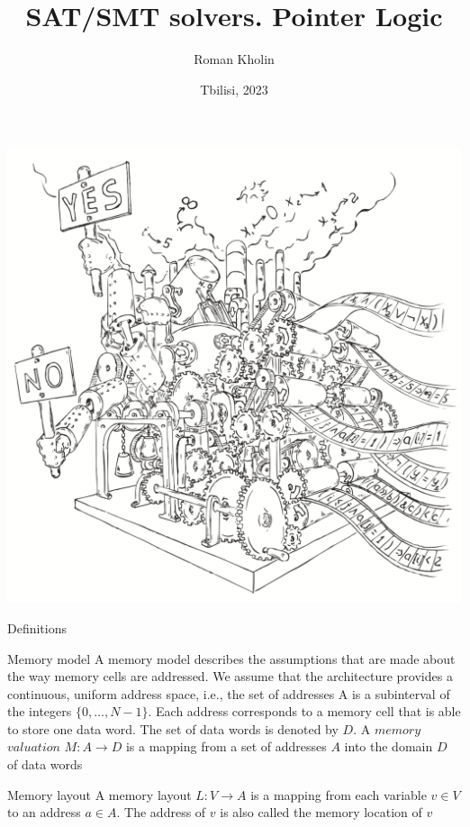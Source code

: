 \documentclass{beamer}
\begin{document}
\title{SAT/SMT solvers. Pointer Logic}
\author{Roman Kholin}
\date{Tbilisi, 2023}

\begin{frame}
\includegraphics[scale=0.5]{../decision-procedure.png}
\end{frame}

\frame{\titlepage}

\begin{frame}{Definitions}
\begin{block}{Memory model}
A memory model describes the assumptions that are made about the way memory cells are addressed. We assume that the architecture provides a continuous, uniform address space, i.e., the set of addresses A is a subinterval of the integers $\{0, \dots, N - 1\}$. Each address corresponds to a memory cell that is able to store one data word. The set of data words is denoted by $D$. A $memory$ $valuation$ $M : A \rightarrow D$ is a mapping from a set of addresses $A$ into the domain $D$ of data words
\end{block}
\begin{block}{Memory layout}
A memory layout $L : V \rightarrow A$ is a mapping from each variable $v \in V$ to an address $a \in A$. The address of $v$ is also called the memory location of $v$
\end{block}
\end{frame}
\end{document}
